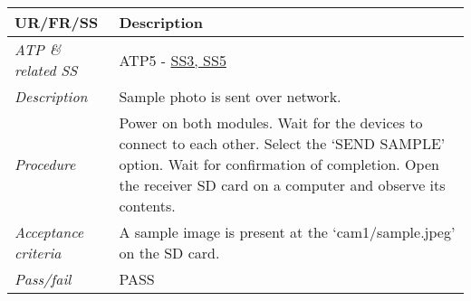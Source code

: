 \documentclass[class=report,11pt,crop=false]{standalone}
\begin{document}
\begin{table}[!ht]
    \centering
    \begin{scriptsize}
    \begin{tabularx}{\textwidth}{|p{} X|}
        
        \hline
        \textbf{UR/FR/SS} & \textbf{Description}\\ \hline
        \textit{ATP \& related SS} & ATP5 - \hyperlink{tab:firmware-requirements}{SS3, SS5} \\
        \textit{Description} & Sample photo is sent over network.\\
        \textit{Procedure} & Power on both modules. Wait for the devices to connect to each other. Select the `SEND SAMPLE' option. Wait for confirmation of completion. Open the receiver SD card on a computer and observe its contents.\\
        \textit{Acceptance criteria} & A sample image is present at the `cam1/sample.jpeg' on the SD card. \\ 
        \textit{Pass/fail} & PASS \\ \hline


\end{tabularx}
\end{scriptsize}
\end{table}
\end{document}
